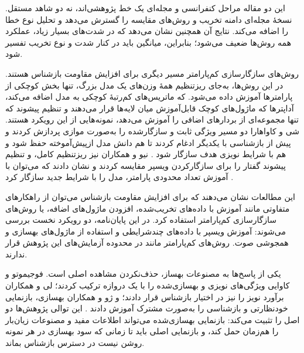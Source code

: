 این دو مقاله مراحل کنفرانسی و مجله‌ای یک خط پژوهشی‌اند، نه دو شاهد مستقل. نسخهٔ مجله‌ای دامنه تخریب و روش‌های مقایسه را گسترش می‌دهد و تحلیل نوع خطا را اضافه می‌کند. نتایج آن همچنین نشان می‌دهد که در شدت‌های بسیار زیاد، عملکرد همه روش‌ها ضعیف می‌شود؛ بنابراین، میانگین  باید در کنار شدت و نوع تخریب تفسیر شود.

روش‌های سازگارسازی کم‌پارامتر مسیر دیگری برای افزایش مقاومت بازشناس هستند. در این روش‌ها، به‌جای ریزتنظیم همهٔ وزن‌های یک مدل بزرگ، تنها بخش کوچکی از پارامترها آموزش داده می‌شود.  که ماتریس‌های کم‌رتبهٔ کوچکی به مدل اضافه می‌کند، آداپترها که ماژول‌های کوچک قابل‌آموزش میان لایه‌ها قرار می‌دهند و تنظیم پیشوند که تنها مجموعه‌ای از بردارهای اضافی را آموزش می‌دهد، نمونه‌هایی از این رویکرد هستند. شی و کاواهارا دو مسیر ویژگی ثابت و سازگارشده را به‌صورت موازی پردازش کردند و پیش از بازشناسی با یکدیگر ادغام کردند تا هم دانش مدل ازپیش‌آموخته حفظ شود و هم با شرایط نویزی هدف سازگار شود . نیو و همکاران نیز ریزتنظیم کامل،  و تنظیم پیشوند گفتار را برای سازگارکردن ویسپر مقایسه کردند و نشان دادند که می‌توان با آموزش تعداد محدودی پارامتر، مدل را با شرایط جدید سازگار کرد .

این مطالعات نشان می‌دهند که برای افزایش مقاومت بازشناس می‌توان از راهکارهای متفاوتی مانند آموزش با داده‌های تخریب‌شده، افزودن ماژول‌های اضافه، یا روش‌های سازگارسازی کم‌پارامتر استفاده کرد. در این پایان‌نامه، دو رویکرد نخست بررسی می‌شوند: آموزش ویسپر با داده‌های چندشرایطی و استفاده از ماژول‌های بهسازی و همجوشی صوت. روش‌های کم‌پارامتر مانند  در محدوده آزمایش‌های این پژوهش قرار ندارند.


یکی از پاسخ‌ها به مصنوعات بهساز، حذف‌نکردن مشاهده اصلی است. فوجیموتو و کاوایی ویژگی‌های نویزی و بهسازی‌شده را با یک دروازه ترکیب کردند؛ لی و همکاران برآورد نویز را نیز در اختیار بازشناس قرار دادند؛ و ژو و همکاران بهسازی، بازنمایی خودنظارتی و بازشناسی را به‌صورت مشترک آموزش دادند . این توالی پژوهش‌ها دو اصل را تثبیت می‌کند: بازنمایی بهسازی‌شده می‌تواند اطلاعات مفید و مصنوعات زیان‌بار را هم‌زمان حمل کند، و بازنمایی اصلی باید تا زمانی که سود بهسازی در هر نمونه روشن نیست در دسترس بازشناس بماند.


